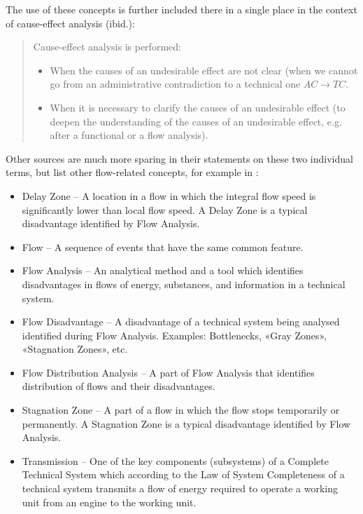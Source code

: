 \documentclass[a4paper,11pt]{article}
\begin{document}
The use of these concepts is further included there in a single place in the
context of cause-effect analysis (ibid.):
\begin{quote}
Cause-effect analysis is performed: 
\begin{itemize}[noitemsep]
\item When the causes of an undesirable effect are not clear (when we cannot
  go from an administrative contradiction to a technical one $AC\to TC$.
\item When it is necessary to clarify the causes of an undesirable effect (to
  deepen the understanding of the causes of an undesirable effect, e.g.  after
  a functional or a flow analysis).
\end{itemize}
\end{quote}
Other sources are much more sparing in their statements on these two
individual terms, but list other flow-related concepts, for example in
\cite{Souchkov2018}:
\begin{itemize}[noitemsep]
\item Delay Zone -- A location in a flow in which the integral flow speed is
  significantly lower than local flow speed. A Delay Zone is a typical
  disadvantage identified by Flow Analysis.
\item Flow -- A sequence of events that have the same common feature.
\item Flow Analysis -- An analytical method and a tool which identifies
  disadvantages in flows of energy, substances, and information in a technical
  system.
\item Flow Disadvantage -- A disadvantage of a technical system being analysed
  identified during Flow Analysis. Examples: Bottlenecks, «Gray Zones»,
  «Stagnation Zones», etc.
\item Flow Distribution Analysis -- A part of Flow Analysis that identifies
  distribution of flows and their disadvantages.
\item Stagnation Zone -- A part of a flow in which the flow stops temporarily
  or permanently. A Stagnation Zone is a typical disadvantage identified by
  Flow Analysis.
\item Transmission -- One of the key components (subsystems) of a Complete
  Technical System which according to the Law of System Completeness of a
  technical system transmits a flow of energy required to operate a working
  unit from an engine to the working unit.
\end{itemize}
\end{document}
